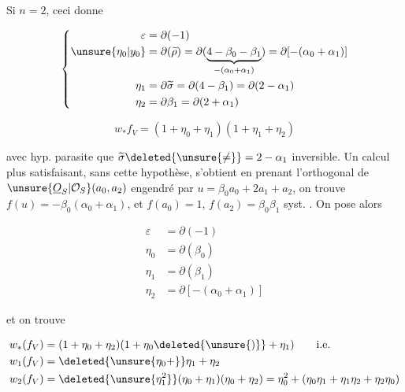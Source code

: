 
Si $n=2$, ceci donne

\[\left\{\begin{aligned}\varepsilon&=\partial(-1)\\ \unsure{\eta_0|y_0}&=\partial(\widetilde\rho)=\partial(\underbrace{4-\beta_0-\beta_1}_{-(\alpha_0+\alpha_1)})=\partial[-(\alpha_0+\alpha_1)]\\ \eta_1&=\partial\widetilde\sigma=\partial(4-\beta_1)=\partial(2-\alpha_1)\\ \eta_2&=\partial\beta_1=\partial(2+\alpha_1)\end{aligned}\right.\]

\[w_* f_V=(1+\eta_0+\eta_1)(1+\eta_1+\eta_2)\]

avec hyp. parasite que $\widetilde\sigma\deleted{\unsure{\ne}}=2-\alpha_1$   inversible. Un calcul plus satisfaisant, sans cette hypothèse, s'obtient en prenant l'orthogonal de $\unsure{\underline O_S|\mathcal O_S}(a_0,a_2)$ engendré par $u=\beta_0 a_0+2a_1+a_2$, on trouve $f(u)=-\beta_0(\alpha_0+\alpha_1)$, et $f(a_0)=1$, $f(a_2)=\beta_0\beta_1$ syst. . On pose alors

\[\begin{aligned}\varepsilon&=\partial(-1)\\\eta_0&=\partial(\beta_0)\\\eta_1&=\partial(\beta_1)\\\eta_2&=\partial[-(\alpha_0+\alpha_1)]\end{aligned}\]

et on trouve

\[\begin{aligned}w_*(f_V)&=(1+\eta_0+\eta_2)(1+\eta_0\deleted{\unsure{)}}+\eta_1)\qquad\text{i.e.}\\w_1(f_V)&=\deleted{\unsure{\eta_0+}}\eta_1+\eta_2\\w_2(f_V)&=\deleted{\unsure{\eta_1^2}}(\eta_0+\eta_1)(\eta_0+\eta_2)=\eta_0^2+(\eta_0\eta_1+\eta_1\eta_2+\eta_2\eta_0)\end{aligned}\]

